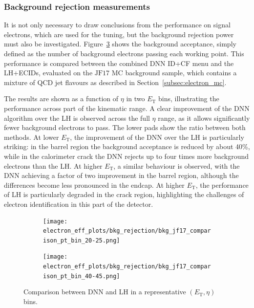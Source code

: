 \subsubsection{Background rejection measurements}

It is not only necessary to draw conclusions from the performance on signal electrons, which are used for the tuning, but the background rejection power must also be investigated. Figure~\ref{fig:bkg_acceptance_mc} shows the background acceptance, simply defined as the number of background electrons passing each working point. This performance is compared between the combined DNN ID+CF menu and the LH+ECIDs, evaluated on the $\text{JF}17$ MC background sample, which contains a mixture of QCD jet flavours as described in Section~\ref{subsec:electron_mc}. 

The results are shown as a function of $\eta$ in two $E_{\mathrm{T}}$ bins, illustrating the performance across part of the kinematic range. A clear improvement of the DNN algorithm over the LH is observed across the full $\eta$ range, as it allows significantly fewer background electrons to pass. The lower pads show the ratio between both methods. 
At lower $E_{\mathrm{T}}$, the improvement of the DNN over the LH is particularly striking: 
in the barrel region the background acceptance is reduced by about 40\%, 
while in the calorimeter crack the DNN rejects up to four times more background electrons than the LH. 
At higher $E_{\mathrm{T}}$, a similar behaviour is observed, with the DNN achieving a factor of two improvement in the barrel region, 
although the differences become less pronounced in the endcap. 
At higher $E_{\mathrm{T}}$, the performance of LH is particularly degraded in the crack region, highlighting the challenges of electron identification in this part of the detector.

\begin{figure}[htbp]
  \centering
  \begin{subfigure}{0.48\textwidth}
    \centering
    \texttt{[image: electron\_eff\_plots/bkg\_rejection/bkg\_jf17\_comparison\_pt\_bin\_20-25.png]}
    \caption{}
    \label{fig:bkg_acceptance_jf17_20_25}
  \end{subfigure}
  \hfill
  \begin{subfigure}{0.48\textwidth}
    \centering
    \texttt{[image: electron\_eff\_plots/bkg\_rejection/bkg\_jf17\_comparison\_pt\_bin\_40-45.png]}
    \caption{}
    \label{fig:bkg_acceptance_jf17_40_45}
  \end{subfigure}
\caption{Comparison between DNN and LH in a representative $(E_{\mathrm{T}},\eta)$ bins.}
\label{fig:bkg_acceptance_mc}
\end{figure}

